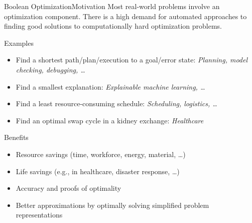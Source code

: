 \documentclass[t,english]{sdqbeamer}
\begin{document}
\begin{frame}{Boolean Optimization}{Motivation}
Most real-world problems involve an optimization component. There is a high demand for automated approaches to finding good solutions to computationally hard optimization problems.\\[1ex]
\begin{block}{Examples}
\begin{itemize}\itemsep1ex
	\item Find a shortest path/plan/execution to a goal/error state: \emph{Planning, model checking, debugging, \dots}
	\item Find a smallest explanation: \emph{Explainable machine learning, \dots}
	\item Find a least resource-consuming schedule: \emph{Scheduling, logistics, \dots}
	\item Find an optimal swap cycle in a kidney exchange: \emph{Healthcare}
\end{itemize}
\end{block}
\begin{block}{Benefits}
\begin{itemize}\itemsep1ex
	\item Resource savings (time, workforce, energy, material, \dots)
	\item Life savings (e.g., in healthcare, disaster response, \dots)
	\item Accuracy and proofs of optimality
	\item Better approximations by optimally solving simplified problem representations
\end{itemize}
\end{block}
\end{frame}
\end{document}
